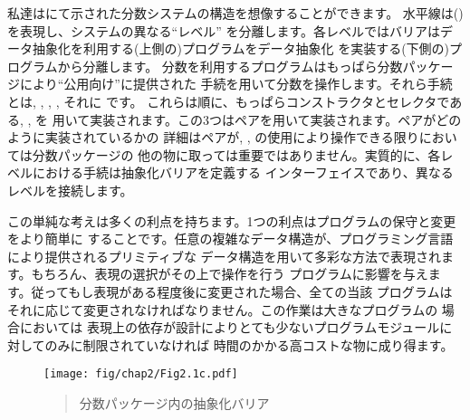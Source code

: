 私達はにて示された分数システムの構造を想像することができます。
水平線は()を表現し、システムの異なる``レベル''
を分離します。各レベルではバリアはデータ抽象化を利用する(上側の)プログラムをデータ抽象化
を実装する(下側の)プログラムから分離します。
分数を利用するプログラムはもっぱら分数パッケージにより``公用向け''に提供された
手続を用いて分数を操作します。それら手続とは,
, , , それに です。
これらは順に、もっぱらコンストラクタとセレクタである, , を
用いて実装されます。この3つはペアを用いて実装されます。ペアがどのように実装されているかの
詳細はペアが, , の使用により操作できる限りにおいては分数パッケージの
他の物に取っては重要ではありません。実質的に、各レベルにおける手続は抽象化バリアを定義する
インターフェイスであり、異なるレベルを接続します。



この単純な考えは多くの利点を持ちます。1つの利点はプログラムの保守と変更をより簡単に
することです。任意の複雑なデータ構造が、プログラミング言語により提供されるプリミティブな
データ構造を用いて多彩な方法で表現されます。もちろん、表現の選択がその上で操作を行う
プログラムに影響を与えます。従ってもし表現がある程度後に変更された場合、全ての当該
プログラムはそれに応じて変更されなければなりません。この作業は大きなプログラムの
場合においては
表現上の依存が設計によりとても少ないプログラムモジュールに対してのみに制限されていなければ
時間のかかる高コストな物に成り得ます。

\begin{figure}[tb]
\label{Figure 2.1}
\centering
\begin{comment}
\begin{quote}
\heading{Figure 2.1:} Data-abstraction barriers in the rational-number package.

\begin{example}
        +------------------------------------+
--------| Programs that use rational numbers |--------
        +------------------------------------+
          Rational numbers in problem domain
            +---------------------------+
------------|   add-rat  sub-rat  ...   |-------------
            +---------------------------+
   Rational numbers as numerators and denominators
              +------------------------+
--------------| make-rat  numer  denom |--------------
              +------------------------+
              Rational numbers as pairs
                  +----------------+
------------------| cons  car  cdr |------------------
                  +----------------+
            However pairs are implemented
\end{example}
\end{quote}
\end{comment}
\texttt{[image: fig/chap2/Fig2.1c.pdf]}
\begin{quote}
 分数パッケージ内の抽象化バリア
\end{quote}
\end{figure}

